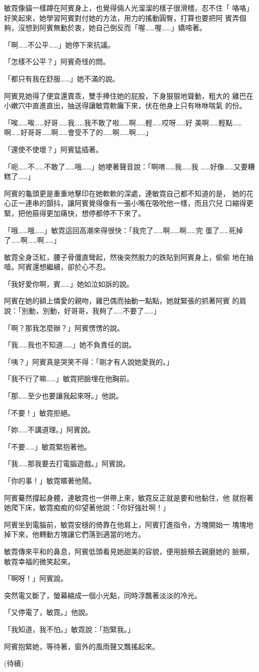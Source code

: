 敏霓像貓一樣蹲在阿賓身上，也覺得倆人光溜溜的樣子很滑稽，忍不住「
咯咯」好笑起來，她學習阿賓對付她的方法，用力的搖動圓臀，打算也要把阿
賓弄個夠，沒想到阿賓無動於衷，她自己倒反而「喔……喔……」嬌啼著。

「啊……不公平……」她停下來抗議。

「怎樣不公平？」阿賓奇怪的問。

「都只有我在舒服……」她不滿的說。

阿賓見她得了便宜還賣乖，雙手捧住她的屁股，下身狠狠地聳動，粗大的
雞巴在小嫩穴中直進直出，抽送得讓敏霓軟癱下來，伏在他身上只有咻咻喘氣
的份。

「唉……唉……好哥……我……我不敢了啦……啊……輕……哎呀……好
美啊……輕點……啊……好哥哥……啊……會受不了的……啊……啊……」

「還使不使壞？」阿賓猛插著。

「呃……不……不敢了……哦……」她哽著聲音說：「啊唷……我……我
……好像……又要糟糕了……」

阿賓的龜頭更是重重地擊印在她軟軟的深處，連敏霓自己都不知道的是，
她的花心正一連串的顫抖，讓阿賓覺得像有一張小嘴在吸吮他一樣，而且穴兒
口縮得更緊，把他箍得更加痛快，想停都停不下來了。

「哦……哦……」敏霓這回高潮來得很快：「我完了……啊……啊……完
蛋了……死掉了……啊……啊……」

敏霓全身泛紅，腰子骨僵直彎起，然後突然脫力的跌貼到阿賓身上，偷偷
地在抽噎。阿賓還想繼續，卻於心不忍。

「我好愛你啊，賓……」她如泣如訴的說。

阿賓在她的額上憐愛的親吻，雞巴偶而抽動一點點，她就緊張的抓著阿賓
的肩說：「別動，別動，好哥哥，我夠了……不要了……」

「啊？那我怎麼辦？」阿賓愣愣的說。

「我……我也不知道……」她不負責任的說。

「咦？」阿賓真是哭笑不得：「剛才有人說她愛我的。」

「我不行了嘛……」敏霓把臉埋在他胸前。

「那……至少也要讓我起來呀。」他說。

「不要！」敏霓拒絕。

「妳……不講道理。」阿賓說。

「不要……」敏霓緊抱著他。

「我……那我要去打電腦遊戲。」阿賓說。

「你的事！」敏霓暱著他鬧。

阿賓驀然撐起身體，連敏霓也一併帶上來，敏霓反正就是要和他黏住，他
就抱著她爬下床，敏霓痴痴的仰望著他說：「你好強壯啊！」

阿賓坐到電腦前，敏霓安穩的倚靠在他肩上，阿賓打進指令，方塊開始一
塊塊地掉下來，他轉動方塊讓它們落到適當的地方。

敏霓傳來平和的鼻息，阿賓低頭看見她甜美的容貌，便用臉頰去親磨她的
臉頰，敏霓幸福的微笑起來。

「啊呀！」阿賓說。

突然電又斷了，螢幕縮成一個小光點，同時浮飄著淡淡的冷光。

「又停電了，敏霓。」他說。

「我知道，我不怕。」敏霓說：「抱緊我。」

阿賓抱緊她，等待著，窗外的風雨聲又飄搖起來。


(待續)










